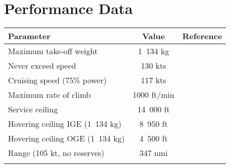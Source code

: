 \section{Performance Data}

\begin{tabularx}{\textwidth}{ | L | c | c | }
  \hline
  \textbf{Parameter}              & \textbf{Value} & \textbf{Reference} \\ \hline
  Maximum take-off weight         & 1~134 kg       & \cite{R44_PilotsOperatingHandbook,Janes20072008} \\ \hline
  Never exceed speed              & 130 kts        & \cite{R44_PilotsOperatingHandbook,EASA-IM-R-121} \\ \hline
  Cruising speed (75\% power)     & 117 kts        & \cite{Janes20072008} \\ \hline
  Maximum rate of climb           & 1000 ft/min    & \cite{Janes20072008} \\ \hline
  Service ceiling                 & 14~000 ft      & \cite{Janes20072008} \\ \hline
  Hovering ceiling IGE (1~134 kg) & 8~950 ft       & \cite{Janes20072008} \\ \hline
  Hovering ceiling OGE (1~134 kg) & 4~500 ft       & \cite{Janes20072008} \\ \hline
  Range (105 kt, no reserves)     & 347 nmi        & \cite{Janes20072008} \\ \hline
  \caption{Performance data}
\end{tabularx}
